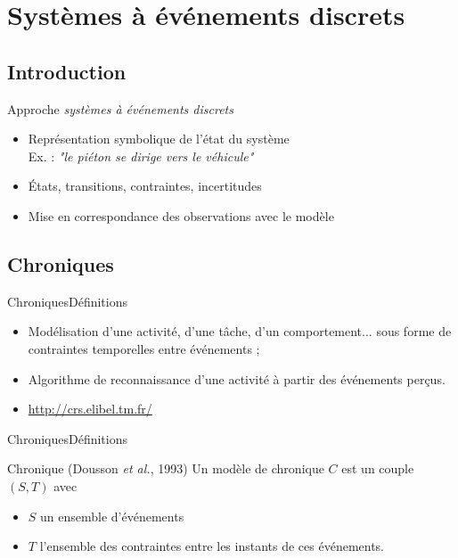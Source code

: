 \documentclass[compress]{beamer}
\begin{document}
\section{Systèmes à événements discrets}

\subsection{Introduction}
\begin{frame}{Approche \it systèmes à événements discrets}
\begin{itemize}
\item Représentation symbolique de l'état du système\\
	Ex. : {\it "le piéton se dirige vers le véhicule"}\\
\item \'Etats, transitions, contraintes, incertitudes
\item Mise en correspondance des observations avec le modèle
\end{itemize}
\end{frame}

\subsection{Chroniques}
\begin{frame}{Chroniques}{Définitions}
\begin{itemize}
\item Modélisation d'une activité, d'une tâche, d'un comportement... sous forme de contraintes temporelles entre événements ;
\item Algorithme de reconnaissance d'une activité à partir des événements perçus.
\item \url{http://crs.elibel.tm.fr/}
\end{itemize}
\end{frame}

\begin{frame}{Chroniques}{Définitions}
\begin{block}{Chronique (Dousson {\it et al.}, 1993)}
Un modèle de chronique $C$ est un couple $(S, T)$ avec
\begin{itemize}
\item $S$ un ensemble d'événements
\item $T$ l'ensemble des contraintes entre les instants de ces événements.
\end{itemize}
\end{block}
\end{frame}
\end{document}
